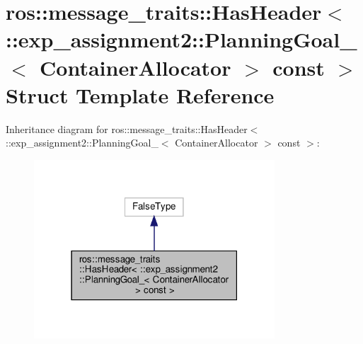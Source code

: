 \hypertarget{structros_1_1message__traits_1_1HasHeader_3_01_1_1exp__assignment2_1_1PlanningGoal___3_01ContainerAllocator_01_4_01const_01_4}{}\section{ros\+:\+:message\+\_\+traits\+:\+:Has\+Header$<$ \+:\+:exp\+\_\+assignment2\+:\+:Planning\+Goal\+\_\+$<$ Container\+Allocator $>$ const $>$ Struct Template Reference}
\label{structros_1_1message__traits_1_1HasHeader_3_01_1_1exp__assignment2_1_1PlanningGoal___3_01ContainerAllocator_01_4_01const_01_4}


Inheritance diagram for ros\+:\+:message\+\_\+traits\+:\+:Has\+Header$<$ \+:\+:exp\+\_\+assignment2\+:\+:Planning\+Goal\+\_\+$<$ Container\+Allocator $>$ const $>$\+:
\nopagebreak
\begin{figure}[H]
\begin{center}
\leavevmode
\includegraphics[width=255pt]{structros_1_1message__traits_1_1HasHeader_3_01_1_1exp__assignment2_1_1PlanningGoal___3_01Contain162d6d10ecc9d82683b36b445d848aa6}
\end{center}
\end{figure}


